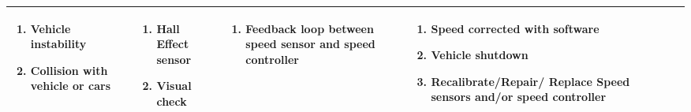 \documentclass [10pt]{article}
\begin{document}
{\begin{minipage}{\textwidth}
\begin{longtable}{ |p{ }  | p{ } |  p{ } |  p{ } | p{ } | p{ } |  p{ }|}
\begin{minipage}{.22\textwidth}
\begin{enumerate}
                    \item Vehicle instability 
                    \item Collision with vehicle or cars\vspace {1mm}
                \end{enumerate}
        \end{minipage}
    & \cellcolor{tableCell}\begin{minipage}{.18\textwidth} 
                \begin{enumerate}
                    \item Hall Effect sensor
                    \item Visual check \vspace {1mm}
                \end{enumerate}
        \end{minipage}
    & \cellcolor{tableCell}\begin{minipage}{.22\textwidth} 
                \vspace{2mm}
                \begin{enumerate}
                    \item Feedback loop between speed sensor and speed controller \vspace {1mm}
                \end{enumerate}
        \end{minipage}
    
    
    & \cellcolor{tableCell}\begin{minipage}{.24 \columnwidth} 
                \vspace{2mm}
                \begin{enumerate}
                    \item Speed corrected with software
                    \item Vehicle shutdown 
                    \item Recalibrate/Repair/ Replace Speed sensors and/or speed controller \vspace {1mm}
                \end{enumerate}
        \end{minipage} \\ \hline
   
  
  
  

\end{longtable}
\end{minipage}}
\end{document}
